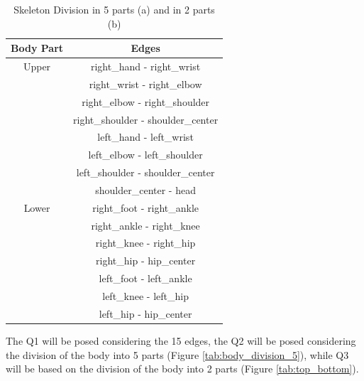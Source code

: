\begin{table}[H]
    \begin{subtable}{\textwidth}
        \centering
        \begin{tabular}{|c|c|}
            \hline
            \textbf{Body Part} & \textbf{Edges} \\
            \hline
            Upper & right\_hand - right\_wrist \\
            & right\_wrist - right\_elbow \\
            & right\_elbow - right\_shoulder \\
            & right\_shoulder - shoulder\_center \\
            & left\_hand - left\_wrist \\
            & left\_elbow - left\_shoulder \\
            & left\_shoulder - shoulder\_center \\
            & shoulder\_center - head \\
            \hline
            Lower & right\_foot - right\_ankle \\
            & right\_ankle - right\_knee \\
            & right\_knee - right\_hip \\
            & right\_hip - hip\_center \\
            & left\_foot - left\_ankle \\
            & left\_knee - left\_hip \\
            & left\_hip - hip\_center \\
            \hline
        \end{tabular}
        \caption{}
        \label{tab:top_bottom}
    \end{subtable}

    \caption{Skeleton Division in 5 parts (a) and in 2 parts (b)}
    \label{tab:skeleton_divisions}
\end{table}

The Q1 will be posed considering the 15 edges, the Q2 will be posed considering the division of the body into 5 parts (Figure \ref{tab:body_division_5}), while Q3 will be based on the division of the body into 2 parts (Figure \ref{tab:top_bottom}).


